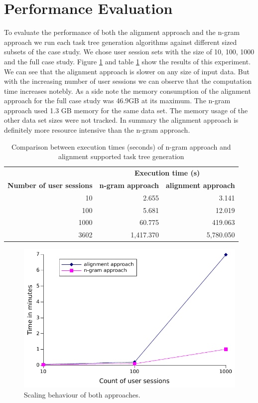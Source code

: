 \section{Performance Evaluation}
To evaluate the performance of both the alignment approach and the n-gram approach we run each task tree generation algorithms against different sized subsets of the case study.
We chose user session sets with the size of 10, 100, 1000 and the full case study. Figure \ref{fig:performance} and table \ref{tab:comparisontasktreegenerations} show the results
of this experiment.
We can see that the alignment approach is slower on any size of input data.
But with the increasing number of user sessions we can observe that the computation time increases notebly.
As a side note the memory consumption of the alignment approach for the full case study was 46.9GB at its maximum.
The n-gram approach used 1.3 GB memory for the same data set.
The memory usage of the other data set sizes were not tracked.
In summary the alignment approach is definitely more resource intensive than the n-gram approach.  
\begin{table}[h]
	\centering
	\begin{tabular}{ r r r }
		\toprule
		& \multicolumn{2}{c}{\textbf{Execution time (s)}} \\
		\cmidrule{2-3}
		\textbf{Number of user sessions} & \textbf{n-gram approach} & \textbf{alignment approach} \\
		\midrule
		10 	& 2.655	& 3.141\\
		100 	& 5.681	& 12.019\\
		1000 	& 60.775	& 419.063\\
		\midrule
		3602 	& 1,417.370 & 5,780.050\\
		\bottomrule
	\end{tabular}
	\caption{Comparison between execution times (seconds) of n-gram approach and alignment supported task tree generation}
	\label{tab:comparisontasktreegenerations}
\end{table}


 \begin{figure}[h]
	\includegraphics{chapters/casestudy/performance.pdf}
	\caption{Scaling behaviour of both approaches.}
	\label{fig:performance}
\end{figure}


